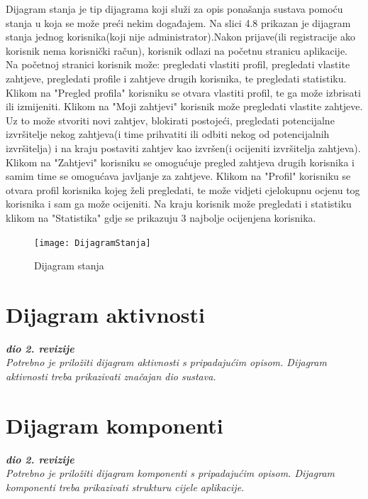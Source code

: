 			Dijagram stanja je tip dijagrama koji služi za opis ponašanja sustava pomoću stanja u koja se može preći nekim događajem. Na slici 4.8 prikazan je dijagram stanja jednog korisnika(koji nije administrator).Nakon prijave(ili registracije ako korisnik nema korisnički račun), korisnik odlazi na početnu stranicu aplikacije. Na početnoj stranici korisnik može: pregledati vlastiti profil, pregledati vlastite zahtjeve, pregledati profile i zahtjeve drugih korisnika, te pregledati statistiku. Klikom na "Pregled profila" korisniku se otvara vlastiti profil, te ga može izbrisati ili izmijeniti. Klikom na "Moji zahtjevi" korisnik može pregledati vlastite zahtjeve. Uz to može stvoriti novi zahtjev, blokirati postojeći, pregledati potencijalne izvršitelje nekog zahtjeva(i time prihvatiti ili odbiti nekog od potencijalnih izvršitelja) i na kraju postaviti zahtjev kao izvršen(i ocijeniti izvršitelja zahtjeva).
			Klikom na "Zahtjevi" korisniku se omogućuje pregled zahtjeva drugih korisnika i samim time se omogućava javljanje za zahtjeve. Klikom na "Profil" korisniku se otvara profil korisnika kojeg želi pregledati, te može vidjeti cjelokupnu ocjenu tog korisnika i sam ga može ocijeniti. Na kraju korisnik može pregledati i statistiku klikom na "Statistika" gdje se prikazuju 3 najbolje ocijenjena korisnika. 
			
			\begin{figure}[h]
				\texttt{[image: DijagramStanja]}
				\caption{Dijagram stanja}
			\end{figure}
			
			
			\eject 
		
		\section{Dijagram aktivnosti}
			
			\textbf{\textit{dio 2. revizije}}\\
			
			 \textit{Potrebno je priložiti dijagram aktivnosti s pripadajućim opisom. Dijagram aktivnosti treba prikazivati značajan dio sustava.}
			
			\eject
		\section{Dijagram komponenti}
		
			\textbf{\textit{dio 2. revizije}}\\
		
			 \textit{Potrebno je priložiti dijagram komponenti s pripadajućim opisom. Dijagram komponenti treba prikazivati strukturu cijele aplikacije.}